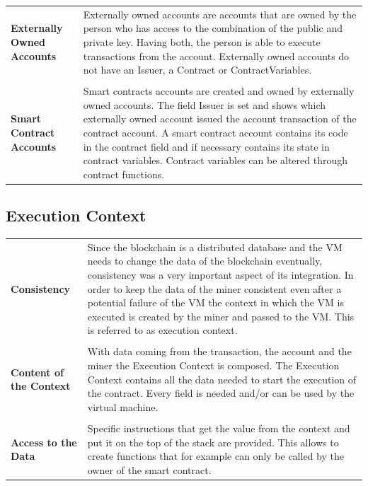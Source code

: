 \begin{tabular}[t]{ p{3cm} p{12.5cm}}
\raggedright
\textbf{Externally Owned Accounts} &
Externally owned accounts are accounts that are owned by the person who has access to the combination of the public and private key. Having both, the person is able to execute transactions from the account. Externally owned accounts do not have an Issuer, a Contract or ContractVariables. \\ \\
\textbf{Smart Contract Accounts} &
Smart contracts accounts are created and owned by externally owned accounts. The field Issuer is set and shows which externally owned account issued the account transaction of the contract account. A smart contract account contains its code in the contract field and if necessary contains its state in contract variables. Contract variables can be altered through contract functions.
\end{tabular}

\subsection{Execution Context}
\begin{tabular}[t]{ p{3cm} p{12.5cm}}
\raggedright
\textbf{Consistency} &
Since the blockchain is a distributed database and the VM needs to change the data of the blockchain eventually, consistency was a very important aspect of its integration. In order to keep the data of the miner consistent even after a potential failure of the VM the context in which the VM is executed is created by the miner and passed to the VM. This is referred to as execution context. \\ \\ %

\raggedright
\textbf{Content of the Context} &
With data coming from the transaction, the account and the miner the Execution Context is composed. The Execution Context contains all the data needed to start the execution of the contract. Every field is needed and/or can be used by the virtual machine. \\ \\ 

\raggedright
\textbf{Access to the Data} &
Specific instructions that get the value from the context and put it on the top of the stack are provided. This allows to create functions that for example can only be called by the owner of the smart contract. 
\end{tabular}

